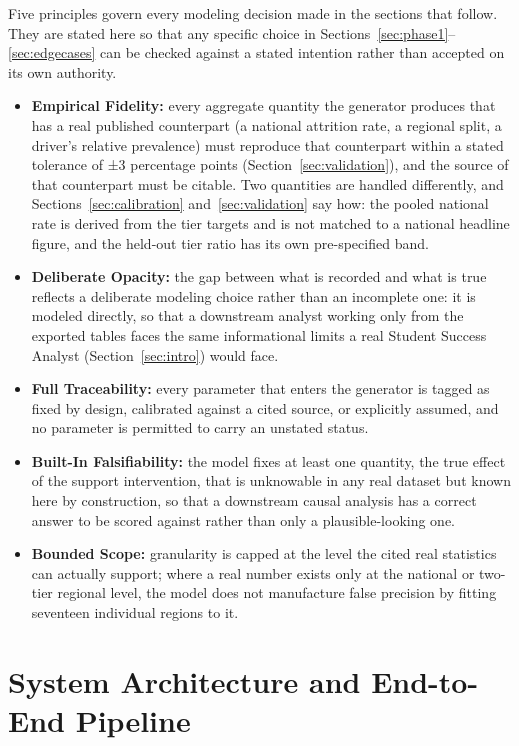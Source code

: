 \documentclass[11pt]{article}
\begin{document}
Five principles govern every modeling decision made in the sections that follow. They are stated here so that any specific choice in Sections~\ref{sec:phase1}--\ref{sec:edgecases} can be checked against a stated intention rather than accepted on its own authority.

\begin{itemize}[topsep=2pt,itemsep=3pt,parsep=0pt]
\item \textbf{Empirical Fidelity:} every aggregate quantity the generator produces that has a real published counterpart (a national attrition rate, a regional split, a driver's relative prevalence) must reproduce that counterpart within a stated tolerance of ±3 percentage points (Section~\ref{sec:validation}), and the source of that counterpart must be citable. Two quantities are handled differently, and Sections~\ref{sec:calibration} and~\ref{sec:validation} say how: the pooled national rate is derived from the tier targets and is not matched to a national headline figure, and the held-out tier ratio has its own pre-specified band.
\item \textbf{Deliberate Opacity:} the gap between what is recorded and what is true reflects a deliberate modeling choice rather than an incomplete one: it is modeled directly, so that a downstream analyst working only from the exported tables faces the same informational limits a real Student Success Analyst (Section~\ref{sec:intro}) would face.
\item \textbf{Full Traceability:} every parameter that enters the generator is tagged as fixed by design, calibrated against a cited source, or explicitly assumed, and no parameter is permitted to carry an unstated status.
\item \textbf{Built-In Falsifiability:} the model fixes at least one quantity, the true effect of the support intervention, that is unknowable in any real dataset but known here by construction, so that a downstream causal analysis has a correct answer to be scored against rather than only a plausible-looking one.
\item \textbf{Bounded Scope:} granularity is capped at the level the cited real statistics can actually support; where a real number exists only at the national or two-tier regional level, the model does not manufacture false precision by fitting seventeen individual regions to it.
\end{itemize}


\FloatBarrier
\section{System Architecture and End-to-End Pipeline}
\label{sec:architecture}
\end{document}
